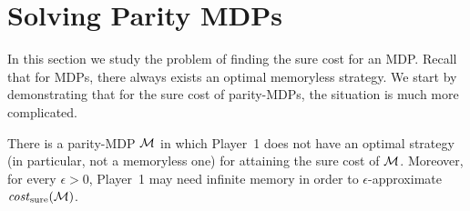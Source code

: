 \documentclass[runningheads,a4paper]{llncs}
\newcommand{\stam}[1]{}
\newcommand{\M}{{\cal M}}
\newcommand{\MDPProb}{{\rm P}}
\newcommand{\costs}{{\it cost}_{\rm sure}}
\newcommand{\attr}{{\rm Attr}}
\newcommand{\env}{{\rm env}}
\newcommand{\sys}{{\rm sys}}
\begin{document}
\stam{
Consider a set $R\subseteq S$. A {\em environment attractor} for $R$, denoted $\attr_{\env}(R)$ is defined inductively as follows. First, $T_0=R$. Now, for every $i>0$, let $T_{i+1}=T_i\cup \{s\in S_1: \text{ for every } a\in A_1(s),\text{ we have that }\delta_1(s,a)\in T_i\} \cup \{s\in S_2: \text{ there exists }a\in A_2(s)\text{ s.t. }\delta_2(s,a)\in T_i \text{ and \MDPProb(s,a)>0}\}$. Then, $\attr_{\env}(R)=\bigcup_{i}T_i$. It is well known that $\attr_{\env}(R)$ can be computed in time polynomial in the description of $\M$. We analogously define the {\em system attractor} $\attr_{\sys}(R)$, by swapping the roles of Players $1$ and $2$.
}

\section{Solving Parity MDPs}
\label{sec: solving}
In this section we study the problem of finding the sure cost for an MDP. Recall that for MDPs, there always exists an optimal memoryless strategy. We start by demonstrating that for the sure cost of parity-MDPs, the situation is much more complicated.
\begin{theorem}
\label{no opt}
There is a parity-MDP $\M$ in which Player~1 does not have an optimal strategy (in particular, not a memoryless one) for attaining the sure cost of $\M$. Moreover, 
for every $\epsilon>0$,
Player~1 
may need
infinite memory in order to 
$\epsilon$-approximate $\costs(\M)$.
\end{theorem}
\end{document}
